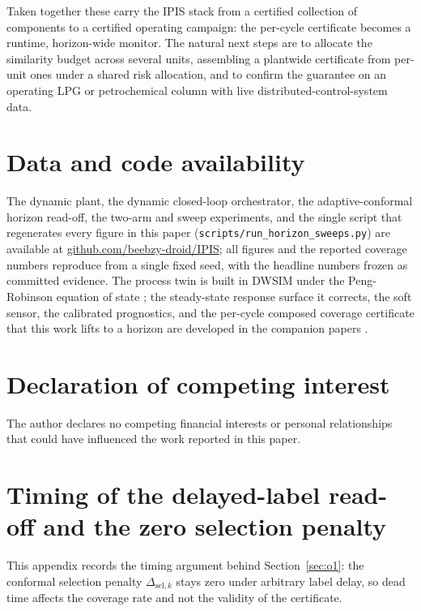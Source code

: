 \documentclass[review,12pt]{elsarticle}
\begin{document}
Taken together these carry the IPIS stack from a certified collection of components to a
certified operating campaign: the per-cycle certificate becomes a runtime, horizon-wide monitor.
The natural next steps are to allocate the similarity budget across several units, assembling a
plantwide certificate from per-unit ones under a shared risk allocation, and to confirm the
guarantee on an operating LPG or petrochemical column with live distributed-control-system data.

\section*{Data and code availability}
The dynamic plant, the dynamic closed-loop orchestrator, the adaptive-conformal horizon
read-off, the two-arm and sweep experiments, and the single script that regenerates every
figure in this paper (\texttt{scripts/run\_horizon\_sweeps.py}) are available at
\url{github.com/beebzy-droid/IPIS}; all figures and the reported coverage numbers reproduce
from a single fixed seed, with the headline numbers frozen as committed evidence. The
process twin is built in DWSIM \citep{dwsim} under the Peng-Robinson equation of state
\citep{peng1976}; the steady-state response surface it corrects, the soft sensor, the
calibrated prognostics, and the per-cycle composed coverage certificate that this work lifts
to a horizon are developed in the companion papers \citep{busico_m3, busico_m1, busico_m2, busico_m4}.

\section*{Declaration of competing interest}
The author declares no competing financial interests or personal relationships that
could have influenced the work reported in this paper.

\appendix
\section{Timing of the delayed-label read-off and the zero selection penalty}
\label{app:o1}

This appendix records the timing argument behind Section~\ref{sec:o1}: the conformal selection
penalty $\Delta_{\mathrm{sel},k}$ stays zero under arbitrary label delay, so dead time affects
the coverage rate and not the validity of the certificate.
\end{document}
